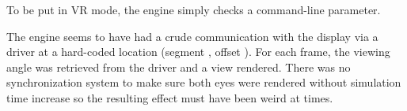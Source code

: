 To be put in VR mode, the engine simply checks a command-line parameter.\\
\par
{}


The engine seems to have had a crude communication with the display via a driver at a hard-coded location (segment , offset ). For each frame, the viewing angle was retrieved from the driver and a view rendered. There was no synchronization system to make sure both eyes were rendered without simulation time increase so the resulting effect must have been weird at times.\\
\par


